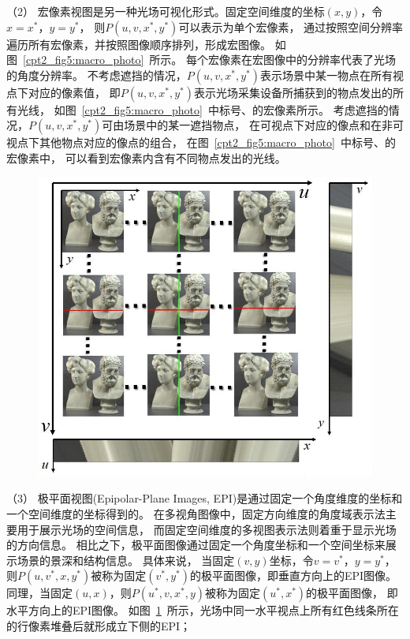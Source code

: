 %
%
%
%
（2）
宏像素视图是另一种光场可视化形式。固定空间维度的坐标$(x, y)$，令$x=x^{*}$，$y=y^{*}$，
则$ P(u, v, x^{*}, y^{*})$可以表示为单个宏像素，
通过按照空间分辨率遍历所有宏像素，并按照图像顺序排列，形成宏图像。
如图~\ref{cpt2_fig5:macro_photo}~所示。
每个宏像素在宏图像中的分辨率代表了光场的角度分辨率。
%
不考虑遮挡的情况，$ P(u, v, x^{*}, y^{*})$表示场景中某一物点在所有视点下对应的像素值，
即$ P(u, v, x^{*}, y^{*})$表示光场采集设备所捕获到的物点发出的所有光线，
如图~\ref{cpt2_fig5:macro_photo}~中标号、的宏像素所示。
考虑遮挡的情况，$ P(u, v, x^{*}, y^{*})$可由场景中的某一遮挡物点，
在可视点下对应的像点和在非可视点下其他物点对应的像点的组合，
在图~\ref{cpt2_fig5:macro_photo}~中标号、的宏像素中，
可以看到宏像素内含有不同物点发出的光线。\par
%
%
%
%
%
\begin{figure}[!ht]
	\centering
	\includegraphics[width=0.75\linewidth]{figures/chapter2/epi_photos}
	\label{cpt2_fig6:epi_photos}
\end{figure}
%
%
%
（3）
极平面视图(Epipolar-Plane Images, EPI)是通过固定一个角度维度的坐标和一个空间维度的坐标得到的。
在多视角图像中，固定方向维度的角度域表示法主要用于展示光场的空间信息，
而固定空间维度的多视图表示法则着重于显示光场的方向信息。
相比之下，极平面图像通过固定一个角度坐标和一个空间坐标来展示场景的景深和结构信息。
具体来说，
当固定$(v, y)$坐标，令$v=v^{*}$，$y=y^{*}$，
则$ P(u, v^{*}, x, y^{*})$被称为固定$(v^{*}, y^{*})$的极平面图像，即垂直方向上的EPI图像。
同理，当固定$(u, x)$，则$ P(u^{*}, v, x^{*}, y)$被称为固定$(u^{*}, x^{*})$的极平面图像，
即水平方向上的EPI图像。
如图~\ref{cpt2_fig6:epi_photos}~所示，光场中同一水平视点上所有红色线条所在的行像素堆叠后就形成立下侧的EPI；

